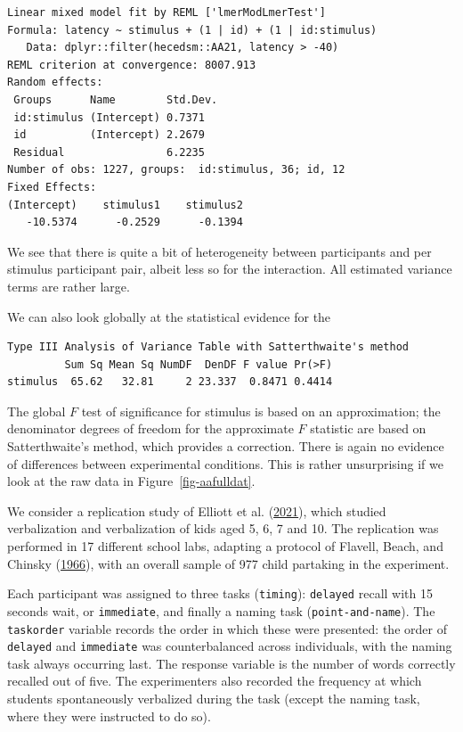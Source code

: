 \documentclass[
  11pt,
  letterpaper,
]{scrbook}
\theoremstyle{definition}
\theoremstyle{remark}
\begin{document}
\begin{verbatim}
Linear mixed model fit by REML ['lmerModLmerTest']
Formula: latency ~ stimulus + (1 | id) + (1 | id:stimulus)
   Data: dplyr::filter(hecedsm::AA21, latency > -40)
REML criterion at convergence: 8007.913
Random effects:
 Groups      Name        Std.Dev.
 id:stimulus (Intercept) 0.7371  
 id          (Intercept) 2.2679  
 Residual                6.2235  
Number of obs: 1227, groups:  id:stimulus, 36; id, 12
Fixed Effects:
(Intercept)    stimulus1    stimulus2  
   -10.5374      -0.2529      -0.1394  
\end{verbatim}

We see that there is quite a bit of heterogeneity between participants
and per stimulus participant pair, albeit less so for the interaction.
All estimated variance terms are rather large.

We can also look globally at the statistical evidence for the

\begin{verbatim}
Type III Analysis of Variance Table with Satterthwaite's method
         Sum Sq Mean Sq NumDF  DenDF F value Pr(>F)
stimulus  65.62   32.81     2 23.337  0.8471 0.4414
\end{verbatim}

The global \(F\) test of significance for stimulus is based on an
approximation; the denominator degrees of freedom for the approximate
\(F\) statistic are based on Satterthwaite's method, which provides a
correction. There is again no evidence of differences between
experimental conditions. This is rather unsurprising if we look at the
raw data in Figure~\ref{fig-aafulldat}.

We consider a replication study of Elliott et al.
(\protect\hyperlink{ref-Elliot:2021}{2021}), which studied verbalization
and verbalization of kids aged 5, 6, 7 and 10. The replication was
performed in 17 different school labs, adapting a protocol of Flavell,
Beach, and Chinsky (\protect\hyperlink{ref-Flavell:1966}{1966}), with an
overall sample of 977 child partaking in the experiment.

Each participant was assigned to three tasks (\texttt{timing}):
\texttt{delayed} recall with 15 seconds wait, or \texttt{immediate}, and
finally a naming task (\texttt{point-and-name}). The \texttt{taskorder}
variable records the order in which these were presented: the order of
\texttt{delayed} and \texttt{immediate} was counterbalanced across
individuals, with the naming task always occurring last. The response
variable is the number of words correctly recalled out of five. The
experimenters also recorded the frequency at which students
spontaneously verbalized during the task (except the naming task, where
they were instructed to do so).
\end{document}
